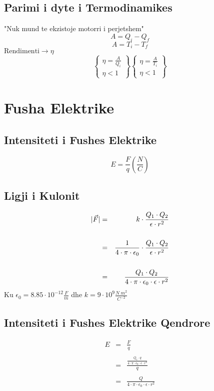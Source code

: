 \documentclass[a4paper, twocolumn]{article}
\DeclarePairedDelimiter\abs{\lvert}{\rvert}
\begin{document}
\subsection{Parimi i dyte i Termodinamikes}
"Nuk mund te ekzistoje motorri i perjetshem"
\[
A=Q_{i}-Q_{f}
\] 
\[
A=T_{i}-T_{f}
\]
$ \text{Rendimenti} \to \eta $
\[
\begin{Bmatrix}
	\eta = \frac{A}{Q_{i}}\\
	\eta < 1
\end{Bmatrix}
\begin{Bmatrix}
	\eta = \frac{A}{T_{i}}\\
	\eta < 1
\end{Bmatrix}
\] 
\section{Fusha Elektrike}
\subsection{Intensiteti i Fushes Elektrike}
\[
	E=\frac{F}{q} \left( \frac{N}{C} \right)
\] 
\subsection{Ligji i Kulonit}
\begin{eqnarray*}
\abs{\vec{F}}&=&k\cdot \frac{Q_{1}\cdot Q_{2}}{\epsilon \cdot r^2}\\
\\
&=&\frac{1}{4\cdot \pi \cdot \epsilon _{0}} \cdot \frac{Q_{1}\cdot Q_{2}}{\epsilon \cdot r^2}\\
\\
&=&\frac{Q_{1}\cdot Q_{2}}{4\cdot \pi \cdot \epsilon _{0}\cdot \epsilon \cdot r^2}\\
\end{eqnarray*}
Ku $\epsilon _{0} = 8.85\cdot 10^{-12} \frac{F}{m}$ dhe $k=9\cdot 10^9 \frac{N \; m^2}{C^{-2}}$
\subsection{Intensiteti i Fushes Elektrike Qendrore}
\begin{eqnarray*}
	E&=& \frac{F}{q} \\
	\\
	 &= & \frac{\frac{Q_{1}\cdot q}{4\cdot \pi \cdot \epsilon _{0}\cdot \epsilon \cdot r^2} }{q} \\
	 \\
	 &= & \frac{Q}{4\cdot \pi \cdot \epsilon _{0}\cdot \epsilon \cdot r^2} \\
\end{eqnarray*}
\end{document}
